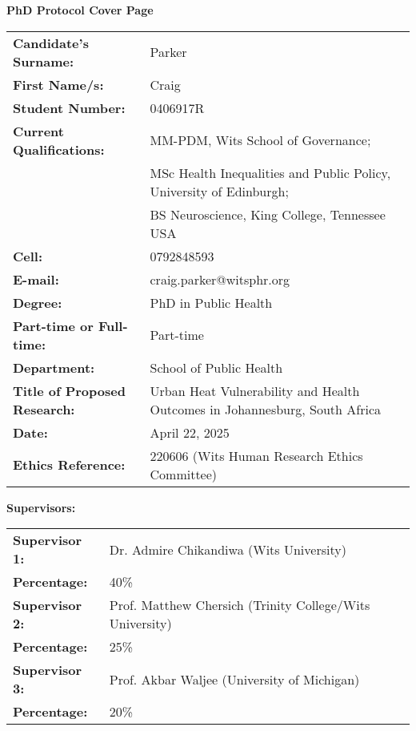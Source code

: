 
\begin{center}
    \Large\textbf{PhD Protocol Cover Page} \\
    \vspace{0.4cm}
\end{center}

\begin{tabular}{ll}
\textbf{Candidate's Surname:} & Parker \\
\textbf{First Name/s:} & Craig \\
\textbf{Student Number:} & 0406917R \\
\textbf{Current Qualifications:} & MM-PDM, Wits School of Governance; \\ 
& MSc Health Inequalities and Public Policy, University of Edinburgh; \\ 
& BS Neuroscience, King College, Tennessee USA \\
\textbf{Cell:} & 0792848593 \\
\textbf{E-mail:} & craig.parker@witsphr.org \\
\textbf{Degree:} & PhD in Public Health \\
\textbf{Part-time or Full-time:} & Part-time \\
\textbf{Department:} & School of Public Health \\
\textbf{Title of Proposed Research:} & Urban Heat Vulnerability and Health Outcomes in Johannesburg, South Africa \\
\textbf{Date:} & April 22, 2025 \\
\textbf{Ethics Reference:} & 220606 (Wits Human Research Ethics Committee) \\
\end{tabular}

\vspace{0.5cm}

\textbf{Supervisors:}

\begin{tabular}{ll}
\textbf{Supervisor 1:} & Dr. Admire Chikandiwa (Wits University) \\
\textbf{Percentage:} & 40\% \\
\textbf{Supervisor 2:} & Prof. Matthew Chersich (Trinity College/Wits University) \\
\textbf{Percentage:} & 25\% \\
\textbf{Supervisor 3:} & Prof. Akbar Waljee (University of Michigan) \\
\textbf{Percentage:} & 20\% \\
\end{tabular}


